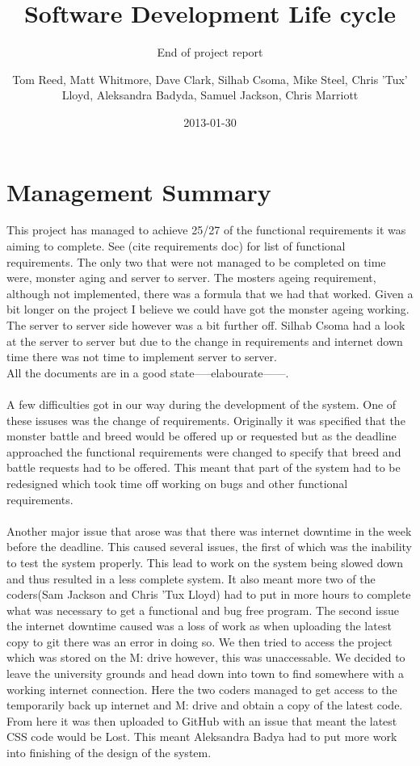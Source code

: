 \documentclass{project}
\begin{document}
\title{Software Development Life cycle}
\subtitle{End of project report}
\author{Tom Reed, Matt Whitmore, Dave Clark, Silhab Csoma, Mike Steel, Chris 'Tux' Lloyd, Aleksandra Badyda, Samuel Jackson, Chris Marriott}
\date{2013-01-30}
\maketitle
\tableofcontents
\newpage
\section{Management Summary}
This project has managed to achieve 25/27 of the functional requirements it was aiming to complete. See (cite requirements doc) for list of functional requirements. The only two that were not managed to be completed on time were, monster aging and server to server. The mosters ageing requirement, although not implemented, there was a formula that we had that worked. Given a bit longer on the project I believe we could have got the monster ageing working. The server to server side however was a bit further off. Silhab Csoma had a look at the server to server but due to the change in requirements and internet down time there was not time to implement server to server.
\\
All the documents are in a good state-----elabourate------.
\\
\\
A few difficulties got in our way during the development of the system. One of these issuses was the change of requirements. Originally it was specified that the monster battle and breed would be offered up or requested but as the deadline approached the functional requirements were changed to specify that breed and battle requests had to be offered. This meant that part of the system had to be redesigned which took time off working on bugs and other functional requirements. 
\\
\\
Another major issue that arose was that there was internet downtime in the week before the deadline. This caused several issues, the first of which was the inability to test the system properly. This lead to work on the system being slowed down and thus resulted in a less complete system. It also meant more two of the coders(Sam Jackson and Chris 'Tux Lloyd) had to put in more hours to complete what was necessary to get a functional and bug free program. 
The second issue the internet downtime caused was a loss of work as when uploading the latest copy to git there was an error in doing so. We then tried to access the project which was stored on the M: drive however, this was unaccessable. We decided to leave the university grounds and head down into town to find somewhere with a working internet connection. Here the two coders managed to get access to the temporarily back up internet and M: drive and obtain a copy of the latest code. From here it was then uploaded to GitHub with an issue that meant the latest CSS code would be Lost. This meant Aleksandra Badya had to put more work into finishing of the design of the system.  
\end{document}

